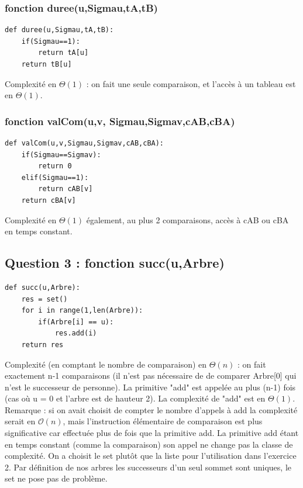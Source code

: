 \documentclass{article}
\begin{document}
\subsubsection{fonction duree(u,Sigmau,tA,tB)}
\begin{lstlisting}
def duree(u,Sigmau,tA,tB):
    if(Sigmau==1):
        return tA[u]
    return tB[u]
\end{lstlisting}

Complexité en $\Theta(1)$ : on fait une seule comparaison, et l'accès à un tableau est en $\Theta(1)$.

\subsubsection{fonction valCom(u,v, Sigmau,Sigmav,cAB,cBA)}
\begin{lstlisting}
def valCom(u,v,Sigmau,Sigmav,cAB,cBA):
    if(Sigmau==Sigmav):
        return 0
    elif(Sigmau==1):
        return cAB[v]
    return cBA[v]
\end{lstlisting}
Complexité en $\Theta(1)$ également, au plus 2 comparaisons, accès à cAB ou cBA en temps constant.

\subsection{Question 3 : fonction succ(u,Arbre) }
\begin{lstlisting}
def succ(u,Arbre):
    res = set()
    for i in range(1,len(Arbre)):
        if(Arbre[i] == u):
            res.add(i)
    return res
\end{lstlisting}
Complexité (en comptant le nombre de comparaison) en $\Theta(n)$ : on fait exactement n-1 comparaisons (il n'est pas nécessaire de de comparer Arbre[0] qui n'est le successeur de personne). La primitive "add" est appelée au plus (n-1) fois (cas où u = 0 et l'arbre est de hauteur 2). La complexité de "add" est en $\Theta(1)$. \\
Remarque : si on avait choisit de compter le nombre d'appels à add la complexité serait en $\mathcal{O}(n)$, mais l'instruction élémentaire de comparaison est plus significative car effectuée plus de fois que la primitive add. La primitive add étant en temps constant (comme la comparaison) son appel ne change pas la classe de complexité.
On a choisit le set plutôt que la liste pour l'utilisation dans l'exercice 2.
Par définition de nos arbres les successeurs d'un seul sommet sont uniques, le set ne pose pas de problème.
\end{document}

